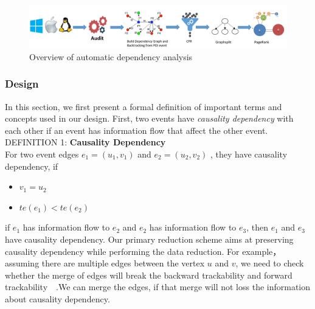 


\begin{figure}[!htp]
	\centering
	
	\includegraphics[width=\textwidth]{figflow2.png}
	\caption{Overview of automatic dependency analysis}
	\label{fig:steps}
\end{figure}


\subsubsection{Design}
In this section,  we first present a formal definition of important terms and concepts used in our design.
First, two events have \textit{causality dependency} with each other if an event has information flow that affect the other event.\\
DEFINITION 1: \textbf{Causality Dependency} \\
\indent For two event edges $e_1 = \mathit{(u_1, v_1)} $ and $e_2 = \mathit{(u_2, v_2)} $ , they have causality dependency, if
\begin{itemize}[noitemsep]
	\item $v_1 = u_2 $
	\item $te\mathit{(e_1)} < te\mathit{(e_2)}$
\end{itemize}
if $e_1$ has information flow to $e_2$ and $e_2$  has information flow to $e_3$, then $e_1$ and $e_3$ have causality dependency.
Our primary reduction scheme aims at preserving causality dependency while performing the data reduction. For example， assuming there are multiple edges between the vertex $u$ and $v$, we need to check whether the merge of edges will break the backward trackability and forward trackability~~\cite{xu2016high}.We can merge the edges, if that merge will not loss the information about causality dependency.


